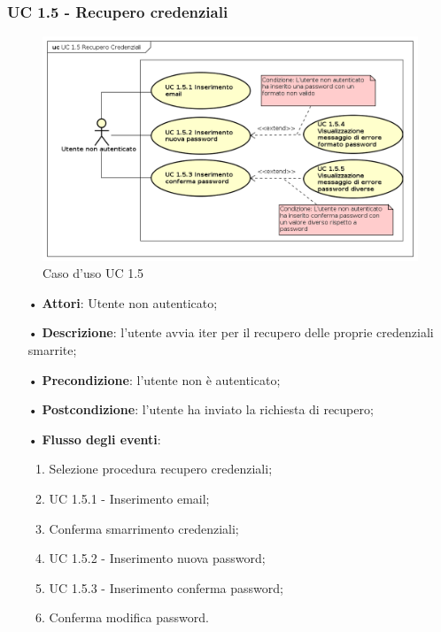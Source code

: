 \subsubsection{UC 1.5 - Recupero credenziali}
\begin{figure}[H]
	\centering
	\includegraphics[width=14cm, keepaspectratio]{img/UC15.png} 
	\caption{Caso d'uso UC 1.5}\label{fig:15}
\end{figure}
\begin{itemize}
	\item[•]\textbf{Attori}: Utente non autenticato;
	\item[•]\textbf{Descrizione}: l’utente avvia iter per il recupero delle proprie credenziali smarrite;
	\item[•]\textbf{Precondizione}: l’utente non è autenticato;
	\item[•]\textbf{Postcondizione}: l’utente ha inviato la richiesta di recupero;
	\item[•]\textbf{Flusso degli eventi}:
	\begin{enumerate}
	\item Selezione procedura recupero credenziali;
	\item UC 1.5.1 - Inserimento email;
	\item Conferma smarrimento credenziali;
	\item UC 1.5.2 - Inserimento nuova password;
	\item UC 1.5.3 - Inserimento conferma password;
	\item Conferma modifica password.
	\end{enumerate}
\end{itemize}

